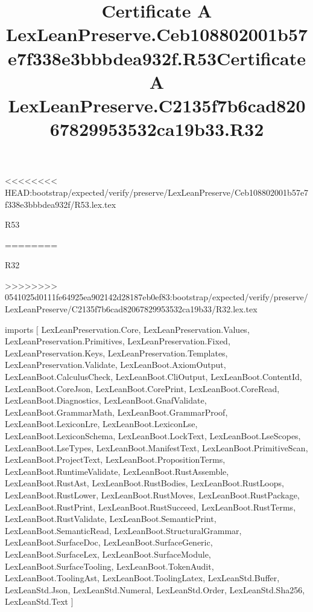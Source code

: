 <<<<<<<< HEAD:bootstrap/expected/verify/preserve/LexLeanPreserve/Ceb108802001b57e7f338e3bbbdea932f/R53.lex.tex
\begin{lexlean}{R53}
\title{Certificate A LexLeanPreserve.Ceb108802001b57e7f338e3bbbdea932f.R53}
========
\begin{lexlean}{R32}
\title{Certificate A LexLeanPreserve.C2135f7b6cad82067829953532ca19b33.R32}
>>>>>>>> 0541025d0111fe64925ea902142d28187eb0ef83:bootstrap/expected/verify/preserve/LexLeanPreserve/C2135f7b6cad82067829953532ca19b33/R32.lex.tex
\begin{coremodule}
imports [
  LexLeanPreservation.Core,
  LexLeanPreservation.Values,
  LexLeanPreservation.Primitives,
  LexLeanPreservation.Fixed,
  LexLeanPreservation.Keys,
  LexLeanPreservation.Templates,
  LexLeanPreservation.Validate,
  LexLeanBoot.AxiomOutput,
  LexLeanBoot.CalculusCheck,
  LexLeanBoot.CliOutput,
  LexLeanBoot.ContentId,
  LexLeanBoot.CoreJson,
  LexLeanBoot.CorePrint,
  LexLeanBoot.CoreRead,
  LexLeanBoot.Diagnostics,
  LexLeanBoot.GnafValidate,
  LexLeanBoot.GrammarMath,
  LexLeanBoot.GrammarProof,
  LexLeanBoot.LexiconLre,
  LexLeanBoot.LexiconLse,
  LexLeanBoot.LexiconSchema,
  LexLeanBoot.LockText,
  LexLeanBoot.LseScopes,
  LexLeanBoot.LseTypes,
  LexLeanBoot.ManifestText,
  LexLeanBoot.PrimitiveScan,
  LexLeanBoot.ProjectText,
  LexLeanBoot.PropositionTerms,
  LexLeanBoot.RuntimeValidate,
  LexLeanBoot.RustAssemble,
  LexLeanBoot.RustAst,
  LexLeanBoot.RustBodies,
  LexLeanBoot.RustLoops,
  LexLeanBoot.RustLower,
  LexLeanBoot.RustMoves,
  LexLeanBoot.RustPackage,
  LexLeanBoot.RustPrint,
  LexLeanBoot.RustSucceed,
  LexLeanBoot.RustTerms,
  LexLeanBoot.RustValidate,
  LexLeanBoot.SemanticPrint,
  LexLeanBoot.SemanticRead,
  LexLeanBoot.StructuralGrammar,
  LexLeanBoot.SurfaceDoc,
  LexLeanBoot.SurfaceGeneric,
  LexLeanBoot.SurfaceLex,
  LexLeanBoot.SurfaceModule,
  LexLeanBoot.SurfaceTooling,
  LexLeanBoot.TokenAudit,
  LexLeanBoot.ToolingAst,
  LexLeanBoot.ToolingLatex,
  LexLeanStd.Buffer,
  LexLeanStd.Json,
  LexLeanStd.Numeral,
  LexLeanStd.Order,
  LexLeanStd.Sha256,
  LexLeanStd.Text
]


\end{coremodule}
\end{lexlean}
\end{lexlean}
